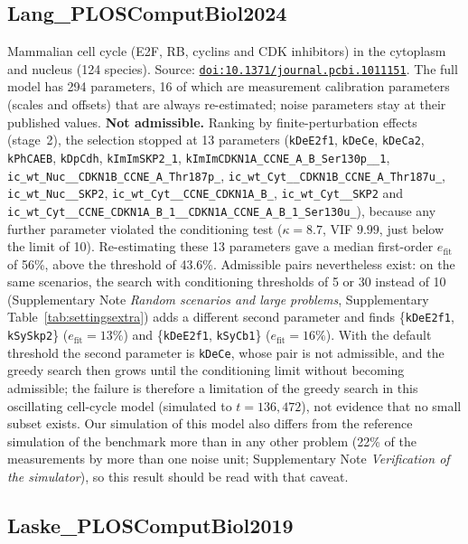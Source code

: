 \subsection*{Lang\_PLOSComputBiol2024}

Mammalian cell cycle (E2F, RB, cyclins and CDK inhibitors) in the cytoplasm and nucleus (124 species). Source: \href{https://doi.org/10.1371/journal.pcbi.1011151}{\nolinkurl{doi:10.1371/journal.pcbi.1011151}}. The full model has 294 parameters, 16 of which are measurement calibration parameters (scales and offsets) that are always re-estimated; noise parameters stay at their published values. \textbf{Not admissible.} Ranking by finite-perturbation effects (stage~2), the selection stopped at 13 parameters (\texttt{kDeE2f1}, \texttt{kDeCe}, \texttt{kDeCa2}, \texttt{kPhCAEB}, \texttt{kDpCdh}, \texttt{kImImSKP2\_1}, \texttt{kImImCDKN1A\_CCNE\_A\_B\_Ser130p\_\_1}, \texttt{ic\_wt\_Nuc\_\_CDKN1B\_CCNE\_A\_Thr187p\_}, \texttt{ic\_wt\_Cyt\_\_CDKN1B\_CCNE\_A\_Thr187u\_}, \texttt{ic\_wt\_Nuc\_\_SKP2}, \texttt{ic\_wt\_Cyt\_\_CCNE\_CDKN1A\_B\_}, \texttt{ic\_wt\_Cyt\_\_SKP2} and \texttt{ic\_wt\_Cyt\_\_CCNE\_CDKN1A\_B\_1\_\_CDKN1A\_CCNE\_A\_B\_1\_Ser130u\_}), because any further parameter violated the conditioning test ($\kappa=8.7$, VIF $9.99$, just below the limit of 10). Re-estimating these 13 parameters gave a median first-order $e_{\mathrm{fit}}$ of 56\%, above the threshold of 43.6\%. Admissible pairs nevertheless exist: on the same scenarios, the search with conditioning thresholds of 5 or 30 instead of 10 (Supplementary Note \emph{Random scenarios and large problems}, Supplementary Table~\ref{tab:settingsextra}) adds a different second parameter and finds \{\texttt{kDeE2f1}, \texttt{kSySkp2}\} ($e_{\mathrm{fit}}=13\%$) and \{\texttt{kDeE2f1}, \texttt{kSyCb1}\} ($e_{\mathrm{fit}}=16\%$). With the default threshold the second parameter is \texttt{kDeCe}, whose pair is not admissible, and the greedy search then grows until the conditioning limit without becoming admissible; the failure is therefore a limitation of the greedy search in this oscillating cell-cycle model (simulated to $t=136{,}472$), not evidence that no small subset exists. Our simulation of this model also differs from the reference simulation of the benchmark more than in any other problem (22\% of the measurements by more than one noise unit; Supplementary Note \emph{Verification of the simulator}), so this result should be read with that caveat.

\subsection*{Laske\_PLOSComputBiol2019}

